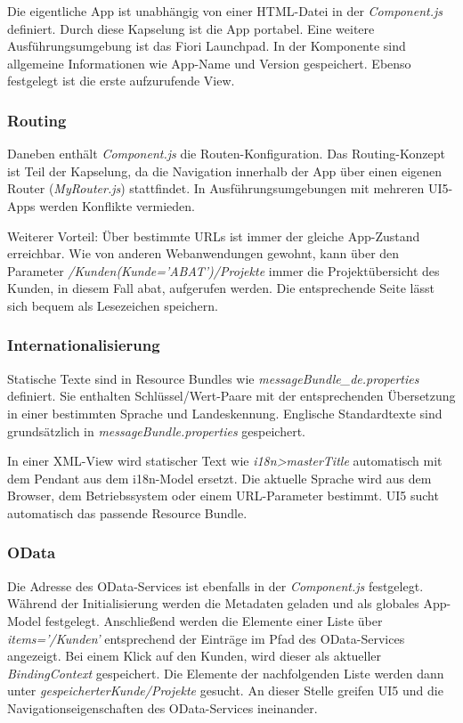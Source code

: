 Die eigentliche App ist unabhängig von einer HTML-Datei in der \textit{Component.js} definiert. Durch diese Kapselung ist die App portabel. Eine weitere Ausführungsumgebung ist \zB das Fiori Launchpad. In der Komponente sind allgemeine Informationen wie App-Name und Version gespeichert. Ebenso festgelegt ist die erste aufzurufende View.

\subsubsection{Routing}
Daneben enthält \textit{Component.js} die Routen-Konfiguration. Das Routing-Konzept ist Teil der Kapselung, da die Navigation innerhalb der App über einen eigenen Router (\textit{MyRouter.js}) stattfindet. In Ausführungsumgebungen mit mehreren UI5-Apps werden Konflikte vermieden.

Weiterer Vorteil: Über bestimmte URLs ist immer der gleiche App-Zustand erreichbar. Wie von anderen Webanwendungen gewohnt, kann über den Parameter \textit{/Kunden(Kunde='ABAT')/Projekte} immer die Projektübersicht des Kunden, in diesem Fall abat, aufgerufen werden. Die entsprechende Seite lässt sich bequem als Lesezeichen speichern.

\subsubsection{Internationalisierung}
Statische Texte sind in Resource Bundles wie \textit{messageBundle\_de.properties} definiert. Sie enthalten Schlüssel/Wert-Paare mit der entsprechenden Übersetzung in einer bestimmten Sprache und Landeskennung. Englische Standardtexte sind grundsätzlich in \textit{messageBundle.properties} gespeichert. 

In einer XML-View wird statischer Text wie \textit{i18n>masterTitle} automatisch mit dem Pendant aus dem i18n-Model ersetzt. Die aktuelle Sprache wird \zB aus dem Browser, dem Betriebssystem oder einem URL-Parameter bestimmt. UI5 sucht automatisch das passende Resource Bundle.

\subsubsection{OData}
Die Adresse des OData-Services ist ebenfalls in der \textit{Component.js} festgelegt. Während der Initialisierung werden die Metadaten geladen und als globales App-Model festgelegt. 
Anschließend werden die Elemente einer Liste \zB über \textit{items='{/Kunden}'} entsprechend der Einträge im Pfad des OData-Services angezeigt. 
Bei einem Klick auf den Kunden, wird dieser als aktueller \textit{BindingContext} gespeichert. Die Elemente der nachfolgenden Liste werden dann unter \textit{{gespeicherterKunde}/Projekte} gesucht. An dieser Stelle greifen UI5 und die Navigationseigenschaften des OData-Services ineinander.

